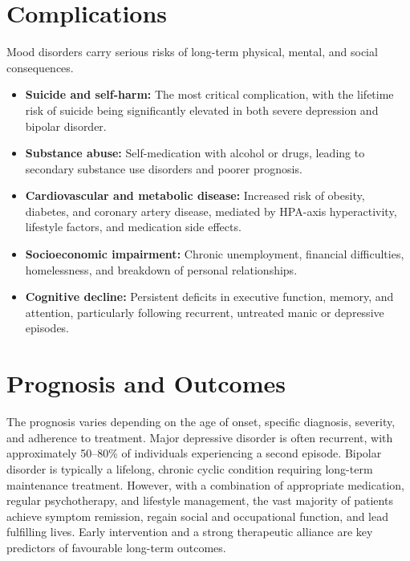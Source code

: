 \section*{Complications}
Mood disorders carry serious risks of long-term physical, mental, and social consequences.
\begin{itemize}
    \item \textbf{Suicide and self-harm:} The most critical complication, with the lifetime risk of suicide being significantly elevated in both severe depression and bipolar disorder.
    \item \textbf{Substance abuse:} Self-medication with alcohol or drugs, leading to secondary substance use disorders and poorer prognosis.
    \item \textbf{Cardiovascular and metabolic disease:} Increased risk of obesity, diabetes, and coronary artery disease, mediated by HPA-axis hyperactivity, lifestyle factors, and medication side effects.
    \item \textbf{Socioeconomic impairment:} Chronic unemployment, financial difficulties, homelessness, and breakdown of personal relationships.
    \item \textbf{Cognitive decline:} Persistent deficits in executive function, memory, and attention, particularly following recurrent, untreated manic or depressive episodes.
\end{itemize}

\section*{Prognosis and Outcomes}
The prognosis varies depending on the age of onset, specific diagnosis, severity, and adherence to treatment. Major depressive disorder is often recurrent, with approximately 50--80\% of individuals experiencing a second episode. Bipolar disorder is typically a lifelong, chronic cyclic condition requiring long-term maintenance treatment. However, with a combination of appropriate medication, regular psychotherapy, and lifestyle management, the vast majority of patients achieve symptom remission, regain social and occupational function, and lead fulfilling lives. Early intervention and a strong therapeutic alliance are key predictors of favourable long-term outcomes.

